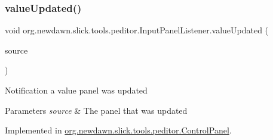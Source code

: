 \subsubsection{\texorpdfstring{value\+Updated()}{valueUpdated()}}
{\footnotesize\ttfamily void org.\+newdawn.\+slick.\+tools.\+peditor.\+Input\+Panel\+Listener.\+value\+Updated (\begin{DoxyParamCaption}\item[{\mbox{\hyperlink{classorg_1_1newdawn_1_1slick_1_1tools_1_1peditor_1_1_value_panel}{Value\+Panel}}}]{source }\end{DoxyParamCaption})}

Notification a value panel was updated


\begin{DoxyParams}{Parameters}
{\em source} & The panel that was updated \\
\hline
\end{DoxyParams}


Implemented in \mbox{\hyperlink{classorg_1_1newdawn_1_1slick_1_1tools_1_1peditor_1_1_control_panel_ae266146cfb9e0f2868c04e510a6ddb43}{org.\+newdawn.\+slick.\+tools.\+peditor.\+Control\+Panel}}.

